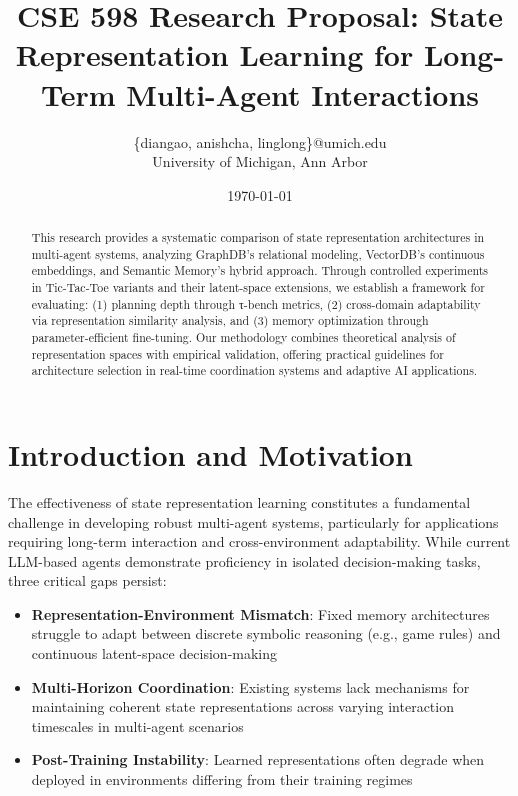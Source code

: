 \documentclass[11pt]{article}
\title{CSE 598 Research Proposal: State Representation Learning for Long-Term Multi-Agent Interactions}
\author{\{diangao, anishcha, linglong\}@umich.edu \\ University of Michigan, Ann Arbor}
\date{\today}
\begin{document}
\maketitle

\begin{abstract}
\noindent This research provides a systematic comparison of state representation architectures in multi-agent systems, analyzing GraphDB's relational modeling, VectorDB's continuous embeddings, and Semantic Memory's hybrid approach. Through controlled experiments in Tic-Tac-Toe variants and their latent-space extensions, we establish a framework for evaluating: (1) planning depth through τ-bench metrics, (2) cross-domain adaptability via representation similarity analysis, and (3) memory optimization through parameter-efficient fine-tuning. Our methodology combines theoretical analysis of representation spaces with empirical validation, offering practical guidelines for architecture selection in real-time coordination systems and adaptive AI applications.
\end{abstract}

\section{Introduction and Motivation}
The effectiveness of state representation learning constitutes a fundamental challenge in developing robust multi-agent systems, particularly for applications requiring long-term interaction and cross-environment adaptability. While current LLM-based agents demonstrate proficiency in isolated decision-making tasks, three critical gaps persist:

\begin{itemize}
    \item \textbf{Representation-Environment Mismatch}: Fixed memory architectures struggle to adapt between discrete symbolic reasoning (e.g., game rules) and continuous latent-space decision-making
    
    \item \textbf{Multi-Horizon Coordination}: Existing systems lack mechanisms for maintaining coherent state representations across varying interaction timescales in multi-agent scenarios
    
    \item \textbf{Post-Training Instability}: Learned representations often degrade when deployed in environments differing from their training regimes
\end{itemize}
\end{document}
